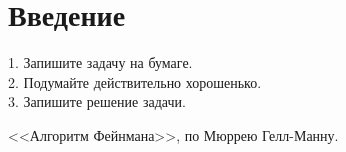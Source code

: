 \chapter{Введение}
\label{chap:intro}

\epigraph{
1. Запишите задачу на бумаге.\\
2. Подумайте действительно хорошенько.\\
3. Запишите решение задачи.
}{<<Алгоритм Фейнмана>>, по Мюррею Гелл-Манну.}
